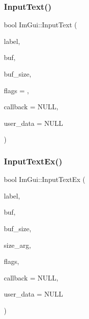 \hypertarget{namespace_im_gui_af2faa757ec3f5e6379f15b0acfac48f7}{}\label{namespace_im_gui_af2faa757ec3f5e6379f15b0acfac48f7} 
\subsubsection{\texorpdfstring{Input\+Text()}{InputText()}}
{\footnotesize\ttfamily bool Im\+Gui\+::\+Input\+Text (\begin{DoxyParamCaption}\item[{const char $\ast$}]{label,  }\item[{char $\ast$}]{buf,  }\item[{size\+\_\+t}]{buf\+\_\+size,  }\item[{Im\+Gui\+Input\+Text\+Flags}]{flags = {},  }\item[{Im\+Gui\+Text\+Edit\+Callback}]{callback = {\ttfamily NULL},  }\item[{void $\ast$}]{user\+\_\+data = {\ttfamily NULL} }\end{DoxyParamCaption})}

\hypertarget{namespace_im_gui_a4a62260abe773d4e193db94cdfdc41bf}{}\label{namespace_im_gui_a4a62260abe773d4e193db94cdfdc41bf} 
\subsubsection{\texorpdfstring{Input\+Text\+Ex()}{InputTextEx()}}
{\footnotesize\ttfamily bool Im\+Gui\+::\+Input\+Text\+Ex (\begin{DoxyParamCaption}\item[{const char $\ast$}]{label,  }\item[{char $\ast$}]{buf,  }\item[{int}]{buf\+\_\+size,  }\item[{const \hyperlink{struct_im_vec2}{Im\+Vec2} \&}]{size\+\_\+arg,  }\item[{Im\+Gui\+Input\+Text\+Flags}]{flags,  }\item[{Im\+Gui\+Text\+Edit\+Callback}]{callback = {\ttfamily NULL},  }\item[{void $\ast$}]{user\+\_\+data = {\ttfamily NULL} }\end{DoxyParamCaption})}

\hypertarget{namespace_im_gui_a94b4d241eafa1a4a077f98f5aee00dda}{}\label{namespace_im_gui_a94b4d241eafa1a4a077f98f5aee00dda} 
